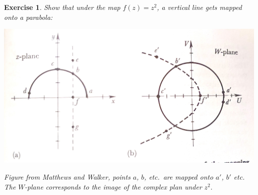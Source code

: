 \documentclass[
  11pt,
	colorful,
	raggedright,
]{tufte-style-thesis-flip}
\newtheorem{exercise}{Exercise}[section]
\begin{document}
\begin{exercise}
Show that under the map $f(z)=z^2$, a vertical line gets mapped onto a parabola:
\begin{center}
\includegraphics[width=.7\textwidth]{figures/lec13z2.jpg}
\end{center}
Figure from Matthews and Walker, points $a$, $b$, etc.\ are mapped onto $a'$, $b'$ etc. The $W$-plane corresponds to the image of the complex plan under $z^2$.
\end{exercise}
\end{document}

